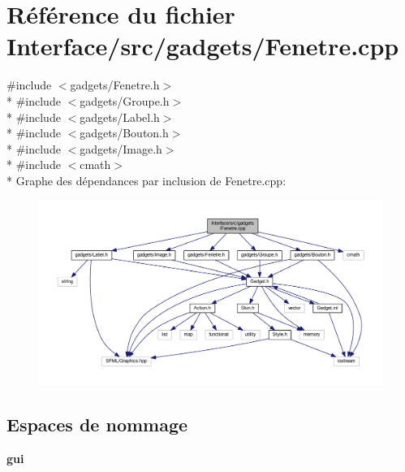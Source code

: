 \section{Référence du fichier Interface/src/gadgets/\+Fenetre.cpp}
\label{_fenetre_8cpp}
{\ttfamily \#include $<$gadgets/\+Fenetre.\+h$>$}\\*
{\ttfamily \#include $<$gadgets/\+Groupe.\+h$>$}\\*
{\ttfamily \#include $<$gadgets/\+Label.\+h$>$}\\*
{\ttfamily \#include $<$gadgets/\+Bouton.\+h$>$}\\*
{\ttfamily \#include $<$gadgets/\+Image.\+h$>$}\\*
{\ttfamily \#include $<$cmath$>$}\\*
Graphe des dépendances par inclusion de Fenetre.\+cpp\+:\nopagebreak
\begin{figure}[H]
\begin{center}
\leavevmode
\includegraphics[width=350pt]{_fenetre_8cpp__incl}
\end{center}
\end{figure}
\subsection*{Espaces de nommage}
\begin{DoxyCompactItemize}
\item 
 {\bf gui}
\end{DoxyCompactItemize}
